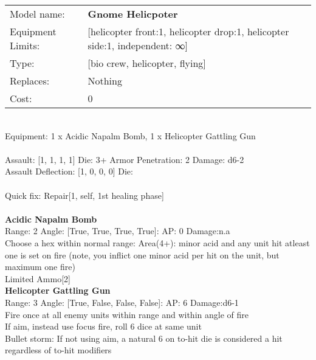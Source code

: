 \noindent
\begin{tabular}{ll}
Model name: &{\bf Gnome Helicpoter } \\
Equipment Limits: &[helicopter front:1, helicopter drop:1, helicopter side:1, independent: ∞] \\
Type: &[bio crew, helicopter, flying] \\
Replaces: &Nothing \\
Cost: & 0\\
\end{tabular}
\ \\
Equipment: 1 x Acidic Napalm Bomb, 1 x Helicopter Gattling Gun \\
\ \\
Assault: [1, 1, 1, 1] Die: 3+ Armor Penetration: 2 Damage: d6-2 \\
Assault Deflection: [1, 0, 0, 0] Die: \\
\indent  
\ \\
Quick fix: Repair[1, self, 1st healing phase]\\ 

\ \\
{\bf Acidic Napalm Bomb } \\



Range: 2  Angle: [True, True, True, True]: AP: 0 Damage:n.a \\
Choose a hex within normal range: Area(4+): minor acid and any unit hit atleast one is set on fire (note, you inflict one minor acid per hit on the unit, but maximum one fire)\\ 
Limited Ammo[2]\\ 




{\bf Helicopter Gattling Gun } \\



Range: 3  Angle: [True, False, False, False]: AP: 6 Damage:d6-1 \\
Fire once at all enemy units within range and within angle of fire\\ 
If aim, instead use focus fire, roll 6 dice at same unit\\ 
Bullet storm: If not using aim, a natural 6 on to-hit die is considered a hit regardless of to-hit modifiers\\ 




 
\ \\



